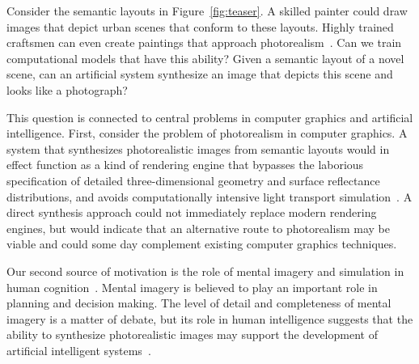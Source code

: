 \begin{comment}
- What is the problem? Why is it interesting and important?

- Why hasn't it been solved yet? What is the challenge?

- What is our contribution? How do we overcome the challenge? What is our key idea?

- Technical details, anything else that is interesting about the approach, extensions.

- What do the experiments say?
\end{comment}

Consider the semantic layouts in Figure~\ref{fig:teaser}. A skilled painter could draw images that depict urban scenes that conform to these layouts. Highly trained craftsmen can even create paintings that approach photorealism~\cite{Letze2013}. Can we train computational models that have this ability? Given a semantic layout of a novel scene, can an artificial system synthesize an image that depicts this scene and looks like a photograph?

This question is connected to central problems in computer graphics and artificial intelligence. First, consider the problem of photorealism in computer graphics. A system that synthesizes photorealistic images from semantic layouts would in effect function as a kind of rendering engine that bypasses the laborious specification of detailed three-dimensional geometry and surface reflectance distributions, and avoids computationally intensive light transport simulation~\cite{Pharr2016}. A direct synthesis approach could not immediately replace modern rendering engines, but would indicate that an alternative route to photorealism may be viable and could some day complement existing computer graphics techniques.

Our second source of motivation is the role of mental imagery and simulation in human cognition~\cite{Kosslyn2006}. Mental imagery is believed to play an important role in planning and decision making. The level of detail and completeness of mental imagery is a matter of debate, but its role in human intelligence suggests that the ability to synthesize photorealistic images may support the development of artificial intelligent systems~\cite{Markman2009}.

